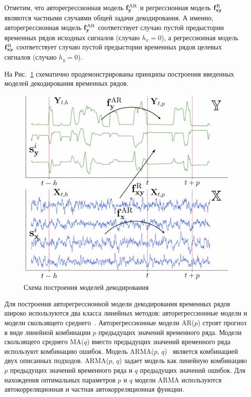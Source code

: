 Отметим, что авторегрессионная модель $\mathbf{f}^{\text{AR}}_{\mathbf{y}}$ и регрессионная модель $\mathbf{f}^{\text{R}}_{\mathbf{x}\mathbf{y}}$ являются частными случаями общей задачи декодирования. А именно, авторегрессионная модель $\mathbf{f}^{\text{AR}}_{\mathbf{y}}$ соответствует случаю пустой предыстории временных рядов исходных сигналов (случаю $h_x = 0$), а регрессионная модель $\mathbf{f}^{\text{R}}_{\mathbf{x}\mathbf{y}}$ соответствует случаю пустой предыстории временных рядов целевых сигналов (случаю $h_y = 0$).

На Рис.~\ref{ch1:fig:time_series_decoding} схематично продемонстрированы принципы построения введенных моделей декодирования временных рядов.

\begin{figure}
	\centering
	\includegraphics[width=0.7\linewidth]{figs/ch1/time_series_decoding}
	\caption{Схема построения моделей декодирования}
	\label{ch1:fig:time_series_decoding}
\end{figure}

Для построения авторегрессионной модели декодирования временных рядов широко используются два класса линейных методов: авторегрессионные модели и модели скользящего среднего~\cite{box2011time,hipel1994time}. 
Авторегрессионные модели AR($p$) строят прогноз в виде линейной комбинации $p$ предыдущих значений временного ряда.
Модели скользящего среднего MA($q$) вместо предыдущих значений временного ряда используют комбинацию ошибок.
Модель ARMA($p$, $q$)~\cite{cochrane2005time} является комбинацией двух описанных подходов. 
ARMA($p$, $q$) задает модель как линейную комбинацию $p$ предыдущих значений временного ряда и $q$ предыдущих значений ошибок. 
Для нахождения оптимальных параметров $p$ и $q$ модели ARMA используются автокорреляционная и частная автокорреляционная функции. 

